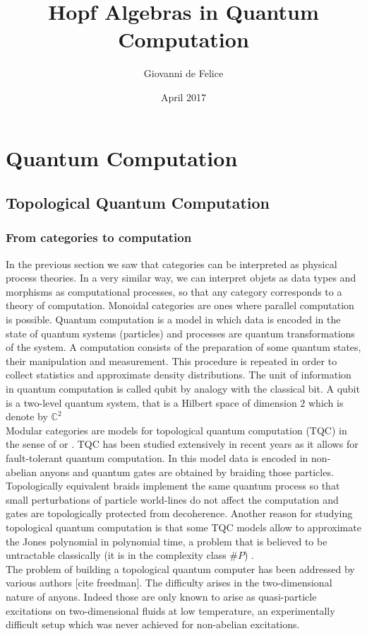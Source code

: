 \documentclass{article}
\title{Hopf Algebras in Quantum Computation}
\author{Giovanni de Felice}
\date{April 2017}
\begin{document}
\section{Quantum Computation}

\subsection{Topological Quantum Computation}

\subsubsection{From categories to computation}
In the previous section we saw that categories can be interpreted as physical process theories. In a very similar way, we can interpret objets as data types and morphisms as computational processes, so that any category corresponds to a theory of computation. Monoidal categories are ones where parallel computation is possible. Quantum computation is a model in which data is encoded in the state of quantum systems (particles) and processes are quantum transformations of the system. A computation consists of the preparation of some quantum states, their manipulation and measurement. This procedure is repeated in order to collect statistics and approximate density distributions. The unit of information in quantum computation is called qubit by analogy with the classical bit. A qubit is a two-level quantum system, that is a Hilbert space of dimension $2$ which is denote by $\mathbb{C}^2$\\
Modular categories are models for topological quantum computation (TQC) in the sense of \cite{Kitaev03} or \cite{Rowell17}. TQC has been studied extensively in recent years as it allows for fault-tolerant quantum computation. In this model data is encoded in non-abelian anyons and quantum gates are obtained by braiding those particles. Topologically equivalent braids implement the same quantum process so that small perturbations of particle world-lines do not affect the computation and gates are topologically protected from decoherence.
Another reason for studying topological quantum computation is that some TQC models allow to approximate the Jones polynomial in polynomial time, a problem that is believed to be untractable classically (it is in the complexity class $\# P$) .\\
The problem of building a topological quantum computer has been addressed by various authors \cite{Kitaev03} [cite freedman]. The difficulty arises in the two-dimensional nature of anyons. Indeed those are only known to arise as quasi-particle excitations on two-dimensional fluids at low temperature, an experimentally difficult setup which was never achieved for non-abelian excitations.\\
\end{document}
